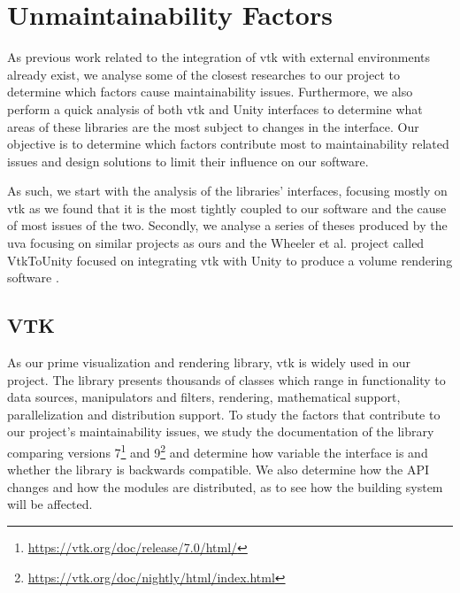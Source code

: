 \chapter{Unmaintainability Factors}
\label{ch:unmaintainability}

As previous work related to the integration of \acrshort{vtk} with external environments already exist, we analyse some of the closest researches to our project to determine which factors cause maintainability issues. Furthermore, we also perform a quick analysis of both \acrshort{vtk} and Unity interfaces to determine what areas of these libraries are the most subject to changes in the interface. Our objective is to determine which factors contribute most to maintainability related issues and design solutions to limit their influence on our software.

As such, we start with the analysis of the libraries' interfaces, focusing mostly on \acrshort{vtk} as we found that it is the most tightly coupled to our software and the cause of most issues of the two. Secondly, we analyse a series of theses produced by the \acrshort{uva} focusing on similar projects as ours \cite{dreuning_visual_2016, shutte_virtual_2018, kruis_creating_2017} and the Wheeler et al. project called VtkToUnity focused on integrating \acrshort{vtk} with Unity to produce a volume rendering software \cite{wheeler_virtual_2018}.

\section{VTK}
\label{ch:unmaintainability-vtk}

As our prime visualization and rendering library, \acrshort{vtk} is widely used in our project. The library presents thousands of classes which range in functionality to data sources, manipulators and filters, rendering, mathematical support, parallelization and distribution support. To study the factors that contribute to our project's maintainability issues, we study the documentation of the library comparing versions 7\footnote{\url{https://vtk.org/doc/release/7.0/html/}} and 9\footnote{\url{https://vtk.org/doc/nightly/html/index.html}} and determine how variable the interface is and whether the library is backwards compatible. We also determine how the API changes and how the modules are distributed, as to see how the building system will be affected.

